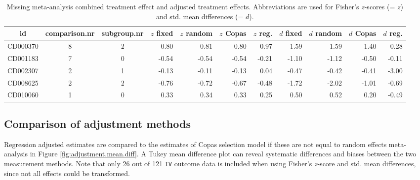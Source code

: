 \documentclass[11pt,a4paper,twoside]{book}\usepackage[]{graphicx}\usepackage[]{color}
\begin{document}
\begin{table}[ht]
\centering
\begingroup\tiny
\begin{tabular}{cccrrrrrrrr}
  \hline
id & comparison.nr & subgroup.nr & $z$ fixed & $z$ random & $z$ Copas & $z$ reg. & $d$ fixed & $d$ random & $d$ Copas & $d$ reg. \\ 
  \hline
CD000370 & 8 & 2 & 0.80 & 0.81 & 0.80 & 0.97 & 1.59 & 1.59 & 1.40 & 0.28 \\ 
  CD001183 & 7 & 0 & -0.54 & -0.54 & -0.54 & -0.21 & -1.10 & -1.12 & -0.50 & -0.11 \\ 
  CD002307 & 2 & 1 & -0.13 & -0.11 & -0.13 & 0.04 & -0.47 & -0.42 & -0.41 & -3.00 \\ 
  CD008625 & 2 & 2 & -0.76 & -0.72 & -0.67 & -0.48 & -1.72 & -2.02 & -1.01 & -0.69 \\ 
  CD010060 & 1 & 0 & 0.33 & 0.34 & 0.33 & 0.25 & 0.50 & 0.52 & 0.20 & -0.49 \\ 
   \hline
\end{tabular}
\endgroup
\caption{Missing meta-analysis combined treatment effect and adjusted treatment effects. Abbreviations are used for Fisher's $z$-scores (= $z$) and std. mean differences (= $d$).} 
\label{missing.differences}
\end{table}



\subsection{Comparison of adjustment methods}
Regression adjusted estimates are compared to the estimates of Copas selection model if these are not equal to random effects meta-analysis in Figure \ref{fig:adjustment.mean.diff}. A Tukey mean difference plot can reveal systematic differences and biases between the two measurement methods. Note that only 26 out of 121 \texttt{IV} outcome data is included when using Fisher's $z$-score and std. mean differences, since not all effects could be transformed.
\end{document}

